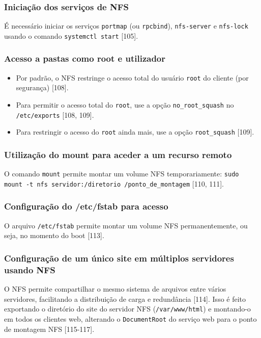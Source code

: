 \documentclass[12pt, a4paper]{article}
\begin{document}
	\subsubsection{Iniciação dos serviços de NFS} %
	É necessário iniciar os serviços \texttt{portmap} (ou \texttt{rpcbind}), \texttt{nfs-server} e \texttt{nfs-lock} usando o comando \texttt{systemctl start} [105].
	
	\subsubsection{Acesso a pastas como root e utilizador} %
	\begin{itemize}
		\item Por padrão, o NFS restringe o acesso total do usuário \texttt{root} do cliente (por segurança) [108].
		\item Para permitir o acesso total do \texttt{root}, use a opção \texttt{no\_root\_squash} no \texttt{/etc/exports} [108, 109].
		\item Para restringir o acesso do \texttt{root} ainda mais, use a opção \texttt{root\_squash} [109].
	\end{itemize}
	
	\subsubsection{Utilização do mount para aceder a um recurso remoto} %
	O comando \texttt{mount} permite montar um volume NFS temporariamente: \texttt{sudo mount -t nfs servidor:/diretorio /ponto\_de\_montagem} [110, 111].
	
	\subsubsection{Configuração do /etc/fstab para acesso} %
	O arquivo \texttt{/etc/fstab} permite montar um volume NFS permanentemente, ou seja, no momento do boot [113].
	
	\subsubsection{Configuração de um único site em múltiplos servidores usando NFS} %
	O NFS permite compartilhar o mesmo sistema de arquivos entre vários servidores, facilitando a distribuição de carga e redundância [114]. Isso é feito exportando o diretório do site do servidor NFS (\texttt{/var/www/html}) e montando-o em todos os clientes web, alterando o \texttt{DocumentRoot} do serviço web para o ponto de montagem NFS [115-117].
	
\end{document}
